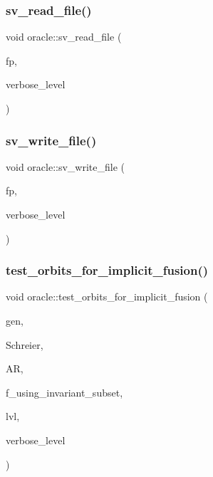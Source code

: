 \subsubsection{\texorpdfstring{sv\+\_\+read\+\_\+file()}{sv\_read\_file()}}
{\footnotesize\ttfamily void oracle\+::sv\+\_\+read\+\_\+file (\begin{DoxyParamCaption}\item[{F\+I\+LE $\ast$}]{fp,  }\item[{\mbox{\hyperlink{galois_8h_a09fddde158a3a20bd2dcadb609de11dc}{I\+NT}}}]{verbose\+\_\+level }\end{DoxyParamCaption})}

\mbox{\label{classoracle_a6d213afc98b633eb3893778c186eb95b}} 
\subsubsection{\texorpdfstring{sv\+\_\+write\+\_\+file()}{sv\_write\_file()}}
{\footnotesize\ttfamily void oracle\+::sv\+\_\+write\+\_\+file (\begin{DoxyParamCaption}\item[{F\+I\+LE $\ast$}]{fp,  }\item[{\mbox{\hyperlink{galois_8h_a09fddde158a3a20bd2dcadb609de11dc}{I\+NT}}}]{verbose\+\_\+level }\end{DoxyParamCaption})}

\mbox{\label{classoracle_adea7f6e638a119f01b378f4f4786c965}} 
\subsubsection{\texorpdfstring{test\+\_\+orbits\+\_\+for\+\_\+implicit\+\_\+fusion()}{test\_orbits\_for\_implicit\_fusion()}}
{\footnotesize\ttfamily void oracle\+::test\+\_\+orbits\+\_\+for\+\_\+implicit\+\_\+fusion (\begin{DoxyParamCaption}\item[{\mbox{\hyperlink{classgenerator}{generator}} $\ast$}]{gen,  }\item[{\mbox{\hyperlink{classschreier}{schreier}} \&}]{Schreier,  }\item[{\mbox{\hyperlink{classaction}{action}} \&}]{AR,  }\item[{\mbox{\hyperlink{galois_8h_a09fddde158a3a20bd2dcadb609de11dc}{I\+NT}}}]{f\+\_\+using\+\_\+invariant\+\_\+subset,  }\item[{\mbox{\hyperlink{galois_8h_a09fddde158a3a20bd2dcadb609de11dc}{I\+NT}}}]{lvl,  }\item[{\mbox{\hyperlink{galois_8h_a09fddde158a3a20bd2dcadb609de11dc}{I\+NT}}}]{verbose\+\_\+level }\end{DoxyParamCaption})}

